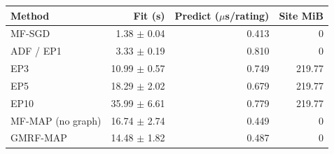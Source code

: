 \begin{tabular}{@{}lrrr@{}}\toprule
Method & Fit (s) & Predict ($\mu$s/rating) & Site MiB\\\midrule
MF-SGD & 1.38 $\pm$ 0.04 & 0.413 & 0\\
ADF / EP1 & 3.33 $\pm$ 0.19 & 0.810 & 0\\
EP3 & 10.99 $\pm$ 0.57 & 0.749 & 219.77\\
EP5 & 18.29 $\pm$ 2.02 & 0.679 & 219.77\\
EP10 & 35.99 $\pm$ 6.61 & 0.779 & 219.77\\
MF-MAP (no graph) & 16.74 $\pm$ 2.74 & 0.449 & 0\\
GMRF-MAP & 14.48 $\pm$ 1.82 & 0.487 & 0\\
\bottomrule\end{tabular}
